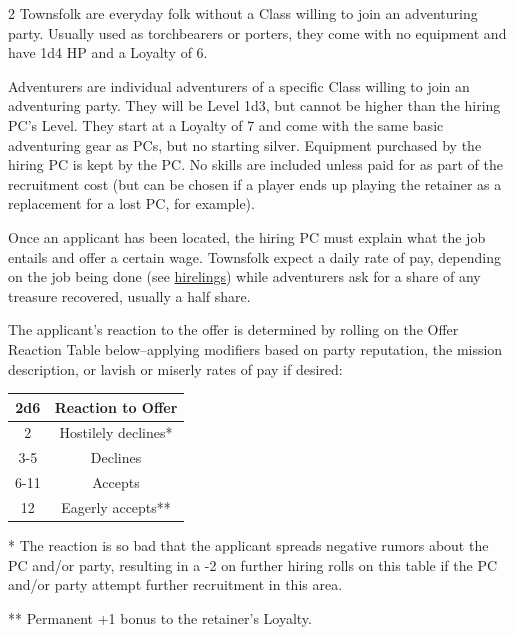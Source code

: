 \documentclass{book}
\begin{document}
\begin{multicols}{2}
Townsfolk are everyday folk without a Class willing to join an
adventuring party. Usually used as torchbearers or porters, they come
with no equipment and have 1d4 HP and a Loyalty of 6.

Adventurers are individual adventurers of a specific Class willing to
join an adventuring party. They will be Level 1d3, but cannot be higher
than the hiring PC's Level. They start at a Loyalty of 7 and come with
the same basic adventuring gear as PCs, but no starting silver.
Equipment purchased by the hiring PC is kept by the PC. No skills are
included unless paid for as part of the recruitment cost (but can be
chosen if a player ends up playing the retainer as a replacement for a
lost PC, for example).

Once an applicant has been located, the hiring PC must explain what the
job entails and offer a certain wage. Townsfolk expect a daily rate of
pay, depending on the job being done (see
\hyperref[hirelings]{hirelings}) while adventurers ask for a share of
any treasure recovered, usually a half share.

The applicant's reaction to the offer is determined by rolling on the
Offer Reaction Table below--applying modifiers based on party
reputation, the mission description, or lavish or miserly rates of pay
if desired:



\begin{table}[H]
	\centering
		\begin{tabular}{cc}
			\toprule
				2d6 & Reaction to Offer \\
			\midrule
				2 & Hostilely declines* \\
				3-5 & Declines \\
				6-11 & Accepts \\
				12 & Eagerly accepts** \\
			\bottomrule
		\end{tabular}
\end{table}

\footnotesize{* The reaction is so bad that the applicant spreads negative rumors about the PC and/or party, resulting in a -2 on further hiring rolls on this table if the PC and/or party attempt further recruitment in this
area.

** Permanent +1 bonus to the retainer's Loyalty.}

\paragraph{}


\end{multicols}
\end{document}
